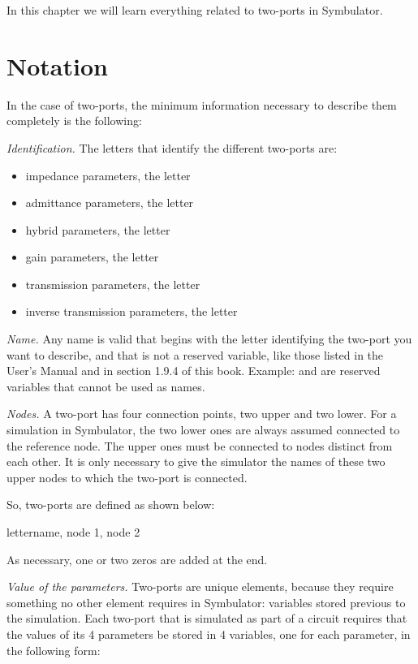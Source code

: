 In this chapter we will learn everything related to two-ports in
Symbulator.

\section{Notation}

In the case of two-ports, the minimum information necessary to
describe them completely is the following:

\emph{Identification.} The letters that identify the different
two-ports are:

\begin{itemize}
\item impedance parameters, the letter 
\item admittance parameters, the letter 
\item hybrid parameters, the letter 
\item gain parameters, the letter 
\item transmission parameters, the letter 
\item inverse transmission parameters, the letter 
\end{itemize}

\emph{Name.} Any name is valid that begins with the letter
identifying the two-port you want to describe, and that is not a
reserved variable, like those listed in the User's Manual and in
section 1.9.4 of this book. Example:  and  are
reserved variables that cannot be used as names.

\emph{Nodes.} A two-port has four connection points, two upper and
two lower. For a simulation in Symbulator, the two lower ones are
always assumed connected to the reference node. The upper ones must
be connected to nodes distinct from each other. It is only necessary
to give the simulator the names of these two upper nodes to which
the two-port is connected.

So, two-ports are defined as shown below:

\begin{entry}
lettername, node 1, node 2
\end{entry}

As necessary, one or two zeros are added at the end.

\emph{Value of the parameters.} Two-ports are unique elements,
because they require something no other element requires in
Symbulator: variables stored previous to the simulation. Each
two-port that is simulated as part of a circuit requires that the
values of its 4 parameters be stored in 4 variables, one for each
parameter, in the following form:

